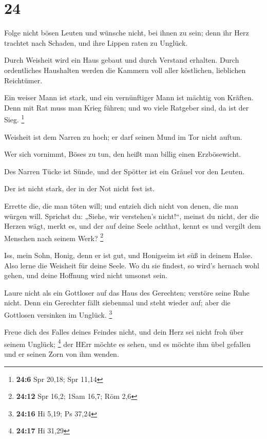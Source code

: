 \hypertarget{section-23}{%
\section{24}\label{section-23}}

 Folge nicht bösen Leuten und wünsche nicht, bei ihnen zu
sein;  denn ihr Herz trachtet nach Schaden, und ihre
Lippen raten zu Unglück.

 Durch Weisheit wird ein Haus gebaut und durch Verstand
erhalten.  Durch ordentliches Haushalten werden die
Kammern voll aller köstlichen, lieblichen Reichtümer.

 Ein weiser Mann ist stark, und ein vernünftiger Mann ist
mächtig von Kräften.  Denn mit Rat muss man Krieg führen;
und wo viele Ratgeber sind, da ist der Sieg. \footnote{\textbf{24:6} Spr
  20,18; Spr 11,14}

 Weisheit ist dem Narren zu hoch; er darf seinen Mund im
Tor nicht auftun.

 Wer sich vornimmt, Böses zu tun, den heißt man billig
einen Erzbösewicht.

 Des Narren Tücke ist Sünde, und der Spötter ist ein
Gräuel vor den Leuten.

 Der ist nicht stark, der in der Not nicht fest ist.

 Errette die, die man töten will; und entzieh dich nicht
von denen, die man würgen will.  Sprichst du: „Siehe, wir
verstehen's nicht!{}``, meinst du nicht, der die Herzen wägt, merkt es,
und der auf deine Seele achthat, kennt es und vergilt dem Menschen nach
seinem Werk? \footnote{\textbf{24:12} Spr 16,2; 1Sam 16,7; Röm 2,6}

 Iss, mein Sohn, Honig, denn er ist gut, und Honigseim
ist süß in deinem Halse.  Also lerne die Weisheit für
deine Seele. Wo du sie findest, so wird's hernach wohl gehen, und deine
Hoffnung wird nicht umsonst sein.

 Laure nicht als ein Gottloser auf das Haus des
Gerechten; verstöre seine Ruhe nicht.  Denn ein Gerechter
fällt siebenmal und steht wieder auf; aber die Gottlosen versinken im
Unglück. \footnote{\textbf{24:16} Hi 5,19; Ps 37,24}

 Freue dich des Falles deines Feindes nicht, und dein
Herz sei nicht froh über seinem Unglück; \footnote{\textbf{24:17} Hi
  31,29}  der HErr möchte es sehen, und es möchte ihm
übel gefallen und er seinen Zorn von ihm wenden.

